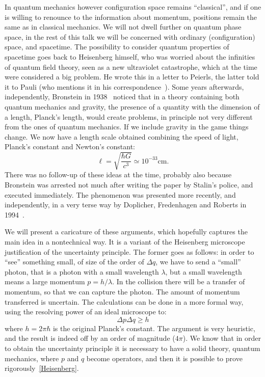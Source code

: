 \documentclass[12pt,a4paper]{article}
\newcommand{\be}{\begin{equation}}
\newcommand{\ee}{\end{equation}}
\newcommand{\formu}[1]{$  #1$}
\begin{document}
In quantum mechanics however configuration space remains ``classical'', and if one is willing to renounce to the information about momentum, positions remain the same as in classical mechanics. 
We will not dwell further on quantum phase space, in the rest of this talk we will be concerned with ordinary (configuration) space, and spacetime. The possibility to consider quantum properties of spacetime goes back to Heisenberg himself, who was worried about the infinities of quantum field theory, seen as a new ultraviolet catastrophe, which at the time were considered a big problem. He wrote this in a letter to Peierls, the latter told it to Pauli (who mentions it in his correspondence~\cite{HeisenbergtoPeirleis}). Some years afterwards, independently, Bronstein in 1938~\cite{Bronstein} noticed that in a theory containing both quantum mechanics and gravity, the presence of a quantity with the dimension of a length, Planck's length, would create problems, in principle not very different from the ones of quantum mechanics. If we include gravity in the game things change. We now have a length scale obtained combining the speed of light, Planck's constant and Newton's constant:  
\be
\ell=\sqrt{\frac{\hbar G}{c^3}}\simeq 10^{-33} \mathrm{cm}. \label{ell}
\ee
There was no follow-up of these ideas at the time, probably also because Bronstein was arrested not much after writing the paper by Stalin's police, and executed immediately. The phenomenon was presented more recently, and independently, in a very terse way by Doplicher, Fredenhagen and Roberts in 1994~\cite{DFR}.

We will present a caricature of these arguments, which hopefully captures the main idea in a nontechnical way.
It is a variant of the Heisenberg microscope justification of the uncertainty principle. The former goes as follows: in order  to ``see'' something small, of size of the order of \formu{\Delta q}, we have to send a ``small'' photon,
that is a photon with a small wavelength \formu{\lambda}, but a
small wavelength means a large momentum \formu{p=h/\lambda}. In
the collision there will be a transfer of momentum, so that we can
capture the photon. The amount of momentum transferred is
uncertain. The calculations can be done in a more formal way, using the resolving power of an ideal  microscope to:
\be
\Delta p \Delta q \geq h
\ee
where $h=2\pi\hbar$ is the original Planck's constant.  The argument is very heuristic, and the result is indeed off by an order of magnitude (\formu{4\pi}). We know that in order to obtain the uncertainty principle it is necessary to have a solid theory, quantum mechanics, where $p$ and $q$ become operators, and then it is possible to prove rigorously~\eqref{Heisenberg}.
\end{document}
